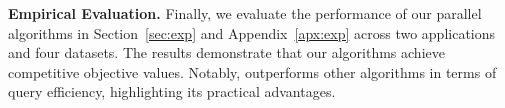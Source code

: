 \textbf{Empirical Evaluation.}
Finally, we evaluate the performance of our parallel algorithms
in Section~\ref{sec:exp} and Appendix~\ref{apx:exp}
across two applications and four datasets.
The results demonstrate that our algorithms achieve competitive objective values.
Notably, \ptgone outperforms other algorithms in terms of query efficiency,
highlighting its practical advantages.








